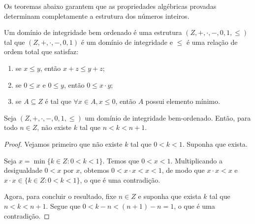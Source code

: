Os teoremas abaixo garantem que as propriedades algébricas provadas determinam completamente a estrutura dos números inteiros.

\begin{definition}
    Um domínio de integridade bem ordenado é uma estrutura $(Z, +, \cdot, -, 0, 1, \leq)$ tal que $(Z, +, \cdot, -, 0, 1)$ é um domínio de integridade e $\leq$ é uma relação de ordem total que satisfaz:
    \begin{enumerate}[label=(\alph*)]
        \item se $x\leq y$, então $x+z\leq y+z$;
        \item se $0\leq x$ e $0\leq y$, então $0\leq x\cdot y$;
        \item se $A\subseteq Z$ é tal que $\forall x \in A, x\leq 0$, então $A$ possui elemento mínimo.
    \end{enumerate}
\end{definition}
\begin{lemma}
    Seja $(Z, +, \cdot, -, 0, 1, \leq)$ um domínio de integridade bem-ordenado.
    Então, para todo $n \in Z$, não existe $k$ tal que $n<k<n+1$.
\end{lemma}
\begin{proof}
    Vejamos primeiro que não existe $k$ tal que $0<k<1$.
    Suponha que exista.

    Seja $x=\min\{k\in Z: 0<k<1\}$.
    Temos que $0<x<1$.
    Multiplicando a desigualdade $0<x$ por $x$, obtemos $0<x\cdot x<x<1$, de modo que $x\cdot x<x$ e $x\cdot x\in \{k\in Z: 0<k<1\}$, o que é uma contradição.

    Agora, para concluir o resultado, fixe $n\in Z$ e suponha que exista $k$ tal que $n<k<n+1$.
    Segue que $0<k-n<(n+1)-n=1$, o que é uma contradição.
\end{proof}

